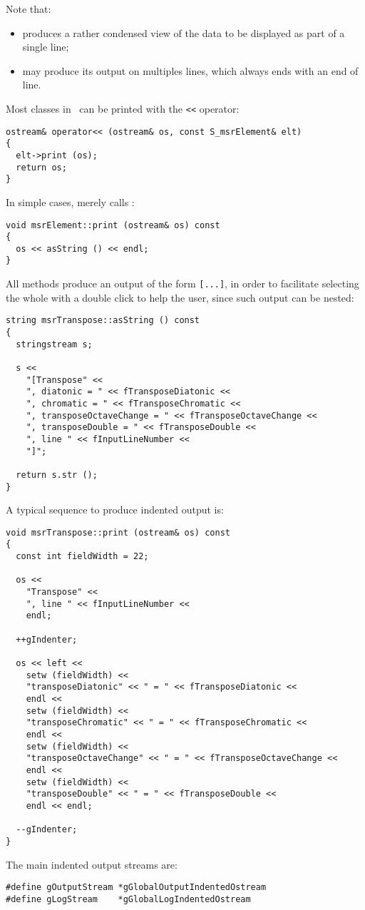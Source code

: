Note that:
\begin{itemize}
\item {} produces a rather condensed view of the data to be displayed as part of a single line;
\item {} may produce its output on multiples lines, which always ends with an end of line.
\end{itemize}

Most classes in \mf\ can be printed with the {\tt <<} operator:
\begin{lstlisting}[language=CPlusPlus]
ostream& operator<< (ostream& os, const S_msrElement& elt)
{
  elt->print (os);
  return os;
}
\end{lstlisting}

In simple cases,  merely calls :
\begin{lstlisting}[language=CPlusPlus]
void msrElement::print (ostream& os) const
{
  os << asString () << endl;
}
\end{lstlisting}

All  methods produce an output of the form {\tt [...]}, in order to facilitate selecting the whole with a double click to help the user, since such output can be nested:
\begin{lstlisting}[language=CPlusPlus]
string msrTranspose::asString () const
{
  stringstream s;

  s <<
    "[Transpose" <<
    ", diatonic = " << fTransposeDiatonic <<
    ", chromatic = " << fTransposeChromatic <<
    ", transposeOctaveChange = " << fTransposeOctaveChange <<
    ", transposeDouble = " << fTransposeDouble <<
    ", line " << fInputLineNumber <<
    "]";

  return s.str ();
}
\end{lstlisting}

A typical sequence to produce indented output is:
\begin{lstlisting}[language=CPlusPlus]
void msrTranspose::print (ostream& os) const
{
  const int fieldWidth = 22;

  os <<
    "Transpose" <<
    ", line " << fInputLineNumber <<
    endl;

  ++gIndenter;

  os << left <<
    setw (fieldWidth) <<
    "transposeDiatonic" << " = " << fTransposeDiatonic <<
    endl <<
    setw (fieldWidth) <<
    "transposeChromatic" << " = " << fTransposeChromatic <<
    endl <<
    setw (fieldWidth) <<
    "transposeOctaveChange" << " = " << fTransposeOctaveChange <<
    endl <<
    setw (fieldWidth) <<
    "transposeDouble" << " = " << fTransposeDouble <<
    endl << endl;

  --gIndenter;
}
\end{lstlisting}

The main indented output streams are:
\begin{lstlisting}[language=CPlusPlus]
#define gOutputStream *gGlobalOutputIndentedOstream
#define gLogStream    *gGlobalLogIndentedOstream

\end{lstlisting}


